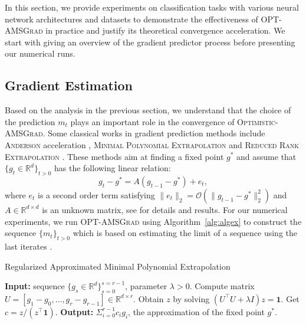 \documentclass[twoside]{article}
\begin{document}
In this section, we provide experiments on classification tasks with various neural network architectures and datasets to demonstrate the effectiveness of \textsc{OPT-AMSGrad} in practice and justify its theoretical convergence acceleration.
We start with giving an overview of the gradient predictor process before presenting our numerical runs.

\subsection{Gradient Estimation}

Based on the analysis in the previous section, we understand that the choice of the prediction $m_t$ plays an important role in the convergence of \textsc{Optimistic-AMSGrad}.
Some classical works in gradient prediction methods include \textsc{Anderson} acceleration \citep{WN11}, \textsc{Minimal Polynomial Extrapolation} \citep{CJ76} and  \textsc{Reduced Rank Extrapolation} \citep{E79}.
These methods aim at finding a fixed point $g^{*}$ and assume that $\{g_t \in \mathbb R^d\}_{t>0} $ has the following linear relation:
\begin{equation} \label{nox}
g_t - g^* = A( g_{t-1} - g^* ) + e_t,
\end{equation}
where $e_t$ is a second order term satisfying $\| e_t \|_2  = \mathcal{O}( \| g_{t-1} - g^* \|_2^2)$ and $A \in \mathbb R^{d \times d}$ is an unknown matrix, see \citep{SAB16} for details and results.
For our numerical experiments, we run \textsc{OPT-AMSGrad} using Algorithm~\ref{alg:algex} to construct the sequence $\{m_t\}_{t>0}$ which is based on estimating the limit of a sequence using the last iterates \citep{BZ13}.

\begin{algorithm}[H]
\begin{algorithmic}[1] 
\small
\caption{Regularized Approximated Minimal Polynomial Extrapolation \citep{SAB16} } \label{alg:algex}
\STATE \textbf{Input:} sequence $\{ g_s \in \mathbb R^d \}_{s=0}^{s=r-1}$, parameter $\lambda > 0$.
\STATE Compute matrix  $U = [ g_1 - g_0, \dots, g_{r} - g_{r-1}] \in \mathbb R^{d \times r}$.
\STATE Obtain $z$ by solving $(U^\top U + \lambda I ) z = \mathbf{1}$.
\STATE Get $c= z / (z^\top \mathbf{1})$.
\STATE \textbf{Output:} $\Sigma_{i=0}^{r-1} c_i g_i$, the approximation of the fixed point $g^*$.
\end{algorithmic}
\end{algorithm}
\end{document}
